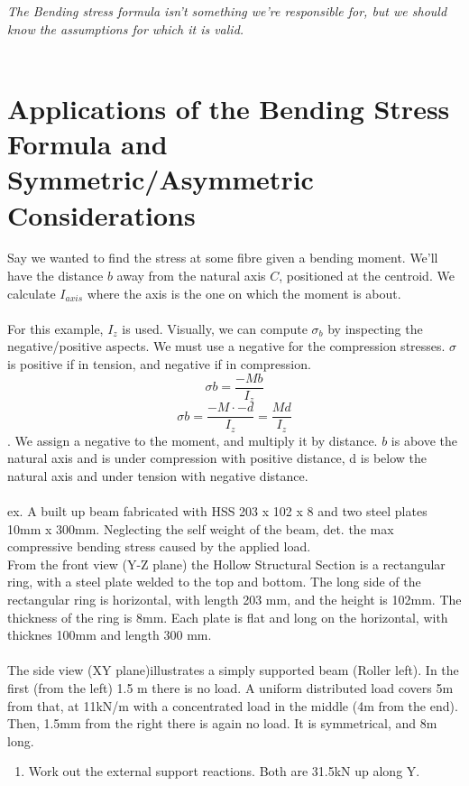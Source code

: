 \documentclass[10pt, twocolumn]{report}
\begin{document}
\textit{The Bending stress formula isn't something we're responsible for, but we should know the assumptions for which it is valid.} \\\\

\section{Applications of the Bending Stress Formula and Symmetric/Asymmetric Considerations}


Say we wanted to find the stress at some fibre given a bending moment. We'll have the distance $b$ away from the natural axis $C$, positioned at the centroid. We calculate $I_{axis}$ where the axis is the one on which the moment is about. \\\\ For this example, $I_z$ is used. Visually, we can compute $\sigma_b$ by inspecting the negative/positive aspects. We must use a negative for the compression stresses. $\sigma$ is positive if in tension, and negative if in compression. $$\sigma b = \frac{-M b}{I_z}$$ $$\sigma b = \frac{-M\cdot -d}{I_z} = \frac{Md}{I_z}$$. We assign a negative to the moment, and multiply it by distance. $b$ is above the natural axis and is under compression with positive distance, d is below the natural axis and under tension with negative distance.\\\\ex. A built up beam fabricated with HSS 203 x 102 x 8 and two steel plates 10mm x 300mm. Neglecting the self weight of the beam, det. the max compressive bending stress caused by the applied load. \\ From the front view (Y-Z plane) the Hollow Structural Section is a rectangular ring, with a steel plate welded to the top and bottom. The long side of the rectangular ring is horizontal, with length 203 mm, and the height is 102mm. The thickness of the ring is 8mm. Each plate is flat and long on the horizontal, with thicknes 100mm and length 300 mm. \\\\ The side view (XY plane)illustrates a simply supported beam (Roller left). In the first (from the left) 1.5 m there is no load.  A uniform distributed load covers 5m from that, at 11kN/m with a concentrated load in the middle (4m from the end). Then, 1.5mm from the right there is again no load. It is symmetrical, and 8m long. \begin{enumerate}
  \item Work out the external support reactions. Both are 31.5kN up along Y.

\end{enumerate}
\end{document}
